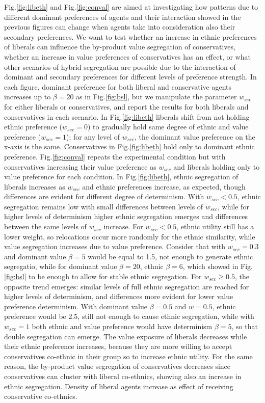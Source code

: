 \documentclass[
]{article}
\begin{document}
Fig.\ref{fig:libeth} and Fig.\ref{fig:conval} are aimed at investigating how patterns due to different dominant preferences of agents and their interaction showed in the previous figures can change when agents take into consideration also their secondary preferences. We want to test whether an increase in ethnic preferences of liberals can influence the by-product value segregation of conservatives, whether an increase in value preferences of conservatives has an effect, or what other scenarios of hybrid segregation are possible due to the interaction of dominant and secondary preferences for different levels of preference strength. In each figure, dominant preference for both liberal and conservative agents increases up to $\beta = 20$ as in Fig.\ref{fig:bsl}, but we manipulate the parameter $w_{sec}$ for either liberals or conservatives, and report the results for both liberals and conservatives in each scenario. In Fig.\ref{fig:libeth} liberals shift from not holding ethnic preference ($w_{sec} = 0$) to gradually hold same degree of ethnic and value preference ($w_{sec} = 1$); for any level of $w_{sec}$, the dominant value preference on the x-axis is the same. Conservatives in Fig.\ref{fig:libeth} hold only to dominant ethnic preference. Fig.\ref{fig:conval} repeats the experimental condition but with conservatives increasing their value preference as $w_{sec}$ and liberals holding only to value preference for each condition. \newline
In Fig.\ref{fig:libeth}, ethnic segregation of liberals increases as $w_{sec}$ and ethnic preferences increase, as expected, though differences are evident for different degree of determinism. With $w_{sec} < 0.5$, ethnic segregation remains low with small differences between levels of $w_{sec}$, while for higher levels of determinism higher ethnic segregation emerges and differences between the same levels of $w_{sec}$ increase. For $w_{sec} < 0.5$, ethnic utility still has a lower weight, so relocations occur more randomly for the ethnic similarity, while value segregation increases due to value preference. Consider that with $w_{sec} = 0.3$ and dominant value $\beta = 5$ would be equal to 1.5, not enough to generate ethnic segregatio, while for dominant value $\beta = 20$, ethnic $\beta = 6$, which showed in Fig.\ref{fig:bsl} to be enough to allow for stable ethnic segregation. For $w_{sec} \geq 0.5$, the opposite trend emerges: similar levels of full ethnic segregation are reached for higher levels of determinism, and differences more evident for lower value preference determinism. With dominant value $\beta = 0.5$ and $w = 0.5$, ethnic preference would be 2.5, still not enough to cause ethnic segregation, while with $w_{sec} = 1$ both ethnic and value preference would have determinism $\beta = 5$, so that double segregation can emerge. The value exposure of liberals decreases while their ethnic preference increases, because they are more willing to accept conservatives co-ethnic in their group so to increase ethnic utility. For the same reason, the by-product value segregation of conservatives decreases since conservatives can cluster with liberal co-ethnics, showing also an increase in ethnic segregation. Density of liberal agents increase as effect of receiving conservative co-ethnics.
\end{document}
